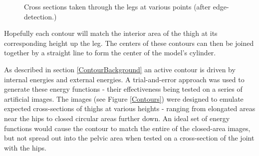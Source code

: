 \begin{figure}[tb]
	\vspace{-10pt}
	\centering
	\quad
	\caption{Cross sections taken through the legs at various points (after edge-detection.)}
	\label{CrossSections}
\end{figure}

Hopefully each contour will match the interior area of the thigh at its corresponding height up the leg.
The centers of these contours can then be joined together by a straight line to form the center of the model's cylinder.

As described in section \ref{ContourBackground} an active contour is driven by internal energies and external energies.
A trial-and-error approach was used to generate these energy functions - their effectiveness being tested on a series of artificial images.
The images (see Figure \ref{Contours}) were designed to emulate expected cross-sections of thighs at various heights - ranging from elongated areas
near the hips to closed circular areas further down.
An ideal set of energy functions would cause the contour to match the entire of the closed-area images, but not spread out into
the pelvic area when tested on a cross-section of the joint with the hips.

